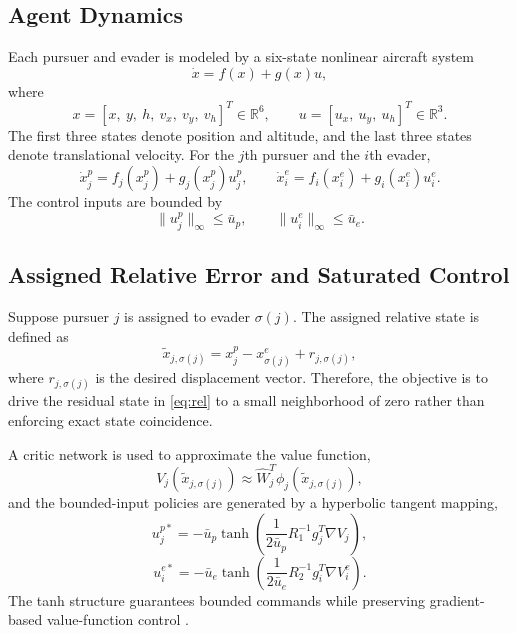 ﻿\documentclass[conference]{IEEEtran}
\begin{document}
\subsection{Agent Dynamics}
Each pursuer and evader is modeled by a six-state nonlinear aircraft system
\begin{equation}
\dot{x}=f(x)+g(x)u,
\label{eq:dynamics}
\end{equation}
where
\begin{equation}
x=[x,\ y,\ h,\ v_x,\ v_y,\ v_h]^T \in \mathbb{R}^{6},
\qquad
u=[u_x,\ u_y,\ u_h]^T \in \mathbb{R}^{3}.
\end{equation}
The first three states denote position and altitude, and the last three states denote translational velocity. For the $j$th pursuer and the $i$th evader,
\begin{equation}
\dot{x}_j^p=f_j(x_j^p)+g_j(x_j^p)u_j^p,
\qquad
\dot{x}_i^e=f_i(x_i^e)+g_i(x_i^e)u_i^e.
\label{eq:pe-dynamics}
\end{equation}
The control inputs are bounded by
\begin{equation}
\|u_j^p\|_{\infty}\leq \bar{u}_p,
\qquad
\|u_i^e\|_{\infty}\leq \bar{u}_e.
\label{eq:bound}
\end{equation}

\subsection{Assigned Relative Error and Saturated Control}
Suppose pursuer $j$ is assigned to evader $\sigma(j)$. The assigned relative state is defined as
\begin{equation}
\tilde{x}_{j,\sigma(j)}=x_j^p-x_{\sigma(j)}^e+r_{j,\sigma(j)},
\label{eq:rel}
\end{equation}
where $r_{j,\sigma(j)}$ is the desired displacement vector. Therefore, the objective is to drive the residual state in \eqref{eq:rel} to a small neighborhood of zero rather than enforcing exact state coincidence.

A critic network is used to approximate the value function,
\begin{equation}
V_j(\tilde{x}_{j,\sigma(j)})\approx \hat{W}_j^T\phi_j(\tilde{x}_{j,\sigma(j)}),
\label{eq:value}
\end{equation}
and the bounded-input policies are generated by a hyperbolic tangent mapping,
\begin{equation}
u_j^{p*}=-\bar{u}_p\tanh\!\left(\frac{1}{2\bar{u}_p}R_1^{-1}g_j^T\nabla V_j\right),
\label{eq:up}
\end{equation}
\begin{equation}
u_i^{e*}=-\bar{u}_e\tanh\!\left(\frac{1}{2\bar{u}_e}R_2^{-1}g_i^T\nabla V_i^e\right).
\label{eq:ue}
\end{equation}
The tanh structure guarantees bounded commands while preserving gradient-based value-function control \cite{ding2010,huo2022,xu2024}.
\end{document}
